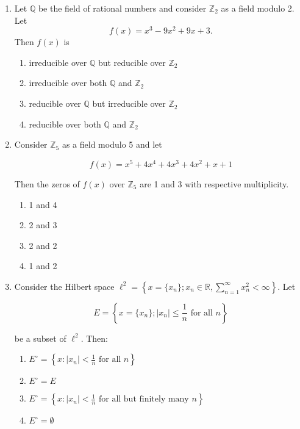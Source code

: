 \documentclass[journal]{IEEEtran}
\numberwithin{figure}{enumi}
\begin{document}
\begin{enumerate}
\item Let $\mathbb{Q}$ be the field of rational numbers and consider $\mathbb{Z}_2$ as a field modulo 2. Let 
\begin{equation*}
f(x) = x^3 - 9x^2 + 9x + 3.
\end{equation*}
Then $f(x)$ is
\begin{enumerate}
    \item irreducible over $\mathbb{Q}$ but reducible over $\mathbb{Z}_2$
    \item irreducible over both $\mathbb{Q}$ and $\mathbb{Z}_2$
    \item reducible over $\mathbb{Q}$ but irreducible over $\mathbb{Z}_2$
    \item reducible over both $\mathbb{Q}$ and $\mathbb{Z}_2$
\end{enumerate}
\item Consider $\mathbb{Z}_5$ as a field modulo 5 and let

\begin{equation*}
f(x) = x^5 + 4x^4 + 4x^3 + 4x^2 + x + 1
\end{equation*}

Then the zeros of $f(x)$ over $\mathbb{Z}_5$ are 1 and 3 with respective multiplicity.

\begin{enumerate}
    \item 1 and 4
    \item 2 and 3
    \item 2 and 2
    \item 1 and 2
\end{enumerate}

\item Consider the Hilbert space $\ell^2 = \left\{ x = \{x_n\}; x_n \in \mathbb{R}, \sum_{n=1}^{\infty} x_n^2 < \infty \right\}$. Let

\begin{equation*}
E = \left\{ x = \{x_n\}; |x_n| \leq \frac{1}{n} \text{ for all } n \right\}
\end{equation*}

be a subset of $\ell^2$. Then:

\begin{enumerate}
    \item $E^\circ = \left\{ x : |x_n| < \frac{1}{n} \text{ for all } n \right\}$
    \item $E^\circ = E$
    \item $E^\circ = \left\{ x : |x_n| < \frac{1}{n} \text{ for all but finitely many } n \right\}$
    \item $E^\circ = \emptyset$
\end{enumerate}


\end{enumerate}
\end{document}
